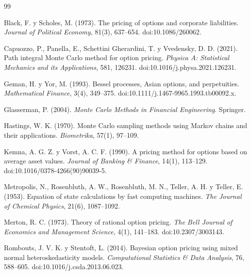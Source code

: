 \documentclass[12pt,letterpaper]{article}
\begin{document}
\begin{thebibliography}{99}

Black, F. y Scholes, M. (1973). The pricing of options and corporate liabilities. \textit{Journal of Political Economy}, 81(3), 637--654. doi:10.1086/260062.

Capuozzo, P., Panella, E., Schettini Gherardini, T. y Vvedensky, D. D. (2021). Path integral Monte Carlo method for option pricing. \textit{Physica A: Statistical Mechanics and its Applications}, 581, 126231. doi:10.1016/j.physa.2021.126231.

Geman, H. y Yor, M. (1993). Bessel processes, Asian options, and perpetuities. \textit{Mathematical Finance}, 3(4), 349--375. doi:10.1111/j.1467-9965.1993.tb00092.x.

Glasserman, P. (2004). \textit{Monte Carlo Methods in Financial Engineering}. Springer.

Hastings, W. K. (1970). Monte Carlo sampling methods using Markov chains and their applications. \textit{Biometrika}, 57(1), 97--109.

Kemna, A. G. Z. y Vorst, A. C. F. (1990). A pricing method for options based on average asset values. \textit{Journal of Banking \& Finance}, 14(1), 113--129. doi:10.1016/0378-4266(90)90039-5.

Metropolis, N., Rosenbluth, A. W., Rosenbluth, M. N., Teller, A. H. y Teller, E. (1953). Equation of state calculations by fast computing machines. \textit{The Journal of Chemical Physics}, 21(6), 1087--1092.

Merton, R. C. (1973). Theory of rational option pricing. \textit{The Bell Journal of Economics and Management Science}, 4(1), 141--183. doi:10.2307/3003143.

Rombouts, J. V. K. y Stentoft, L. (2014). Bayesian option pricing using mixed normal heteroskedasticity models. \textit{Computational Statistics \& Data Analysis}, 76, 588--605. doi:10.1016/j.csda.2013.06.023.

\end{thebibliography}
\end{document}

